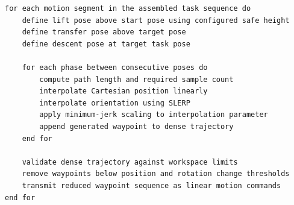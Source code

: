 \begin{lstlisting}[caption={Pseudocode for waypoint generation and path reduction.}, label={lst:trajectory-generation}]
for each motion segment in the assembled task sequence do
    define lift pose above start pose using configured safe height
    define transfer pose above target pose
    define descent pose at target task pose

    for each phase between consecutive poses do
        compute path length and required sample count
        interpolate Cartesian position linearly
        interpolate orientation using SLERP
        apply minimum-jerk scaling to interpolation parameter
        append generated waypoint to dense trajectory
    end for

    validate dense trajectory against workspace limits
    remove waypoints below position and rotation change thresholds
    transmit reduced waypoint sequence as linear motion commands
end for
\end{lstlisting}
